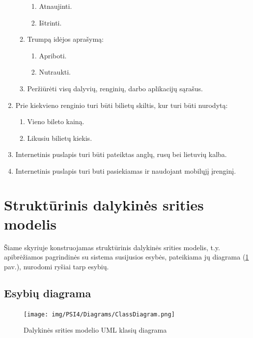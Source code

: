 \documentclass{VUMIFPSkursinis}
\begin{document}
\begin{enumerate}[label=\textbf{FR\arabic*}]
\begin{enumerate}[label*=\textbf{.\arabic*}]
\begin{enumerate}[label*=\textbf{.\arabic*}]
						        \item Atnaujinti.
						        \item Ištrinti.
						    \end{enumerate}
						\item Trumpą idėjos aprašymą:
                            \begin{enumerate}[label*=\textbf{.\arabic*}]
						        \item Apriboti.
						        \item Nutraukti.
						    \end{enumerate}
						\item Peržiūrėti visų dalyvių, renginių, darbo aplikacijų sąrašus.
					\end{enumerate}
			    \item Prie kiekvieno renginio turi būti bilietų skiltis, kur turi būti nurodytą:
					\begin{enumerate}[label*=\textbf{.\arabic*}]
						\item Vieno bileto kainą.
						\item Likusiu bilietų kiekis.
					\end{enumerate}
				\item Internetinis puslapis turi būti pateiktas anglų, rusų bei lietuvių kalba.
				\item  Internetinis puslapis turi buti pasiekiamas ir naudojant mobilųjį įrenginį.
			\end{enumerate}

    \section{Struktūrinis dalykinės srities modelis} \label{strukturinisDSModelis}
		Šiame skyriuje konstruojamas struktūrinis dalykinės srities modelis, t.y. apibrėžiamos pagrindinės su sistema susijusios esybės, pateikiama jų diagrama (\ref{fig:DS-klasiu-diagrama} pav.), nurodomi ryšiai tarp esybių.
        \subsection{Esybių diagrama} \label{strukturinisDSModelis_esybiuDiagrama}
            \begin{figure}[H]
                \centering
                \texttt{[image: img/PSI4/Diagrams/ClassDiagram.png]}
                \caption{Dalykinės srities modelio UML klasių diagrama}
                \label{fig:DS-klasiu-diagrama}
            \end{figure}
\end{document}
